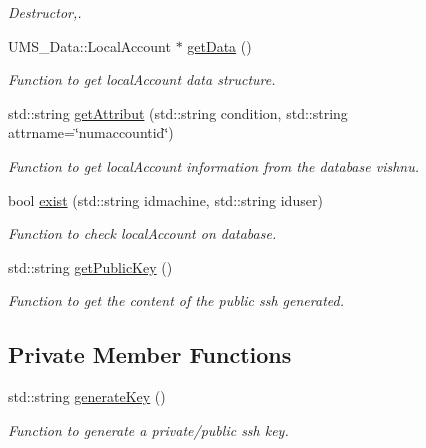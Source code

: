\begin{DoxyCompactItemize}
\begin{DoxyCompactList}\small\item\em Destructor,. \item\end{DoxyCompactList}\item 
UMS\_\-Data::LocalAccount $\ast$ \hyperlink{classLocalAccountServer_a1bb0c984d1ce965e20ae82e3618f630b}{getData} ()
\begin{DoxyCompactList}\small\item\em Function to get localAccount data structure. \item\end{DoxyCompactList}\item 
std::string \hyperlink{classLocalAccountServer_a053a743969d33cc7eef2d921c0c0ca55}{getAttribut} (std::string condition, std::string attrname=\char`\"{}numaccountid\char`\"{})
\begin{DoxyCompactList}\small\item\em Function to get localAccount information from the database vishnu. \item\end{DoxyCompactList}\item 
bool \hyperlink{classLocalAccountServer_a5d6c7a0b3ce13905d606046ecf57d56e}{exist} (std::string idmachine, std::string iduser)
\begin{DoxyCompactList}\small\item\em Function to check localAccount on database. \item\end{DoxyCompactList}\item 
std::string \hyperlink{classLocalAccountServer_a38294d33446210c15297f0dcc32130ff}{getPublicKey} ()
\begin{DoxyCompactList}\small\item\em Function to get the content of the public ssh generated. \item\end{DoxyCompactList}\end{DoxyCompactItemize}
\subsection*{Private Member Functions}
\begin{DoxyCompactItemize}
\item 
\hypertarget{classLocalAccountServer_a2cbcd93a4b1dcd0cdc85bbfc08338356}{
std::string \hyperlink{classLocalAccountServer_a2cbcd93a4b1dcd0cdc85bbfc08338356}{generateKey} ()}
\label{classLocalAccountServer_a2cbcd93a4b1dcd0cdc85bbfc08338356}

\begin{DoxyCompactList}\small\item\em Function to generate a private/public ssh key. \item\end{DoxyCompactList}\end{DoxyCompactItemize}
